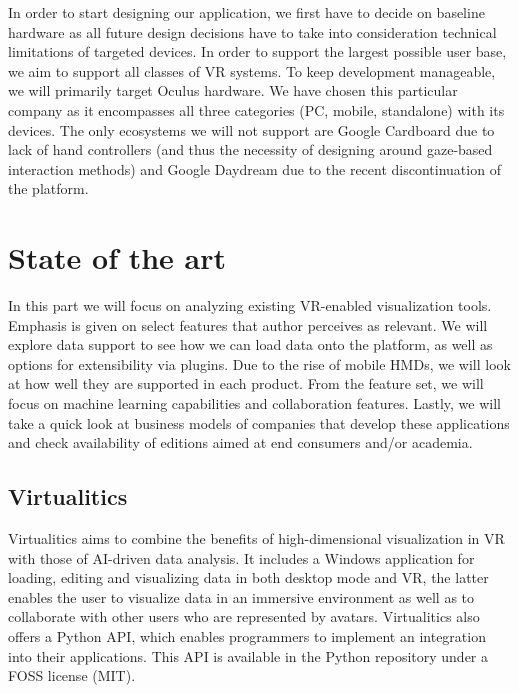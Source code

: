 \documentclass[thesis=M,english,hidelinks]{FITthesisXE}[2012/06/26]
\begin{document}
In order to start designing our application, we first have to decide on baseline hardware as all future design decisions have to take into consideration technical limitations of targeted devices. In order to support the largest possible user base, we aim to support all classes of VR systems. To keep development manageable, we will primarily target Oculus hardware. We have chosen this particular company as it encompasses all three categories (PC, mobile, standalone) with its devices. The only ecosystems we will not support are Google Cardboard due to lack of hand controllers (and thus the necessity of designing around gaze-based interaction methods) and Google Daydream due to the recent discontinuation of the platform.\autocite{daydreameol}

\section{State of the art}

In this part we will focus on analyzing existing VR-enabled visualization tools. Emphasis is given on select features that author perceives as relevant. We will explore data support to see how we can load data onto the platform, as well as options for extensibility via plugins. Due to the rise of mobile HMDs, we will look at how well they are supported in each product. From the feature set, we will focus on machine learning capabilities and collaboration features. Lastly, we will take a quick look at business models of companies that develop these applications and check availability of editions aimed at end consumers and/or academia.

\subsection{Virtualitics}

Virtualitics aims to combine the benefits of high-dimensional visualization in VR with those of AI-driven data analysis.\autocite{virtualitics} It includes a Windows application for loading, editing and visualizing data in both desktop mode and VR, the latter enables the user to visualize data in an immersive environment as well as to collaborate with other users who are represented by avatars. Virtualitics also offers a Python API, which enables programmers to implement an integration into their applications. This API is available in the Python repository under a FOSS license (MIT).\autocite{pyvip}
\end{document}
